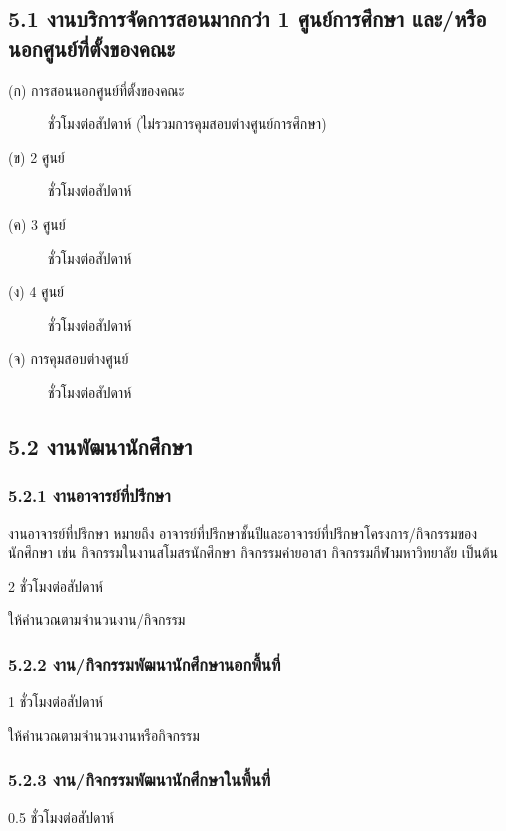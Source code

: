 \documentclass[a4paper,12pt,english]{sphinxmanual}
\begin{document}
\subsection{5.1 งานบริการจัดการสอนมากกว่า 1 ศูนย์การศึกษา และ/หรือ นอกศูนย์ที่ตั้งของคณะ}
\label{\detokenize{workload_rubric:id90}}\begin{description}
\item[{(ก) การสอนนอกศูนย์ที่ตั้งของคณะ}]  ชั่วโมงต่อสัปดาห์ (ไม่รวมการคุมสอบต่างศูนย์การศึกษา)

\item[{(ข) 2 ศูนย์}]  ชั่วโมงต่อสัปดาห์

\item[{(ค) 3 ศูนย์}]  ชั่วโมงต่อสัปดาห์

\item[{(ง) 4 ศูนย์}]  ชั่วโมงต่อสัปดาห์

\item[{(จ) การคุมสอบต่างศูนย์}]  ชั่วโมงต่อสัปดาห์

\end{description}


\subsection{5.2 งานพัฒนานักศึกษา}
\label{\detokenize{workload_rubric:id91}}

\subsubsection{5.2.1 งานอาจารย์ที่ปรึกษา}
\label{\detokenize{workload_rubric:id92}}
งานอาจารย์ที่ปรึกษา หมายถึง อาจารย์ที่ปรึกษาชั้นปีและอาจารย์ที่ปรึกษาโครงการ/กิจกรรมของนักศึกษา เช่น กิจกรรมในงานสโมสรนักศึกษา กิจกรรมค่ายอาสา กิจกรรมกีฬามหาวิทยาลัย เป็นต้น

2 ชั่วโมงต่อสัปดาห์

ให้คำนวณตามจำนวนงาน/กิจกรรม


\subsubsection{5.2.2 งาน/กิจกรรมพัฒนานักศึกษานอกพื้นที่}
\label{\detokenize{workload_rubric:id93}}
1 ชั่วโมงต่อสัปดาห์

ให้คำนวณตามจำนวนงานหรือกิจกรรม


\subsubsection{5.2.3 งาน/กิจกรรมพัฒนานักศึกษาในพื้นที่}
\label{\detokenize{workload_rubric:id94}}
0.5 ชั่วโมงต่อสัปดาห์
\end{document}
